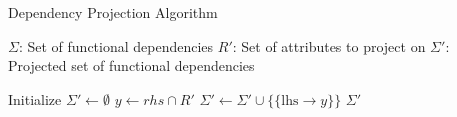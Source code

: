 \documentclass[UTF8]{beamer}
\begin{document}
\begin{frame}{Dependency Projection Algorithm}
\begin{algorithm}[H]
\small
\caption{Dependency Projection Algorithm\footnote{\href{https://github.com/pratik2358/fucntional_dep/blob/main/functional_deps.ipynb}
{\textcolor{blue}{Link to code$\to$ Cell 1:} \textcolor{red}{project\_dependency}}}}
\label{algorithm:algo}
\begin{algorithmic}[1]
\REQUIRE $\Sigma$: Set of functional dependencies
\REQUIRE $R'$: Set of attributes to project on
\ENSURE $\Sigma'$: Projected set of functional dependencies

\STATE Initialize $\Sigma' \gets \emptyset$
        \STATE $y \gets rhs \cap R'$
            \STATE $\Sigma' \gets \Sigma' \cup \{\{\text{lhs} \to y\}\}$
        \ENDIF
    \ENDIF
\ENDFOR
\RETURN $\Sigma'$
\end{algorithmic}
\end{algorithm}
\end{frame}
\end{document}

